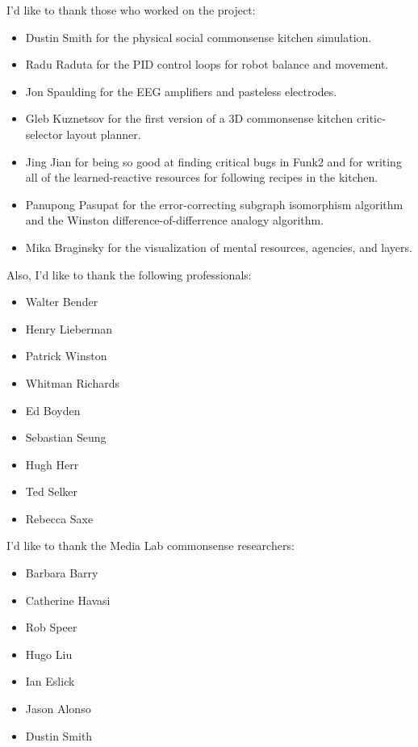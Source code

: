 \vspace{5mm}

I'd like to thank those who worked on the project:
\begin{itemize}
\item{Dustin Smith for the physical social commonsense kitchen simulation.}
\item{Radu Raduta for the PID control loops for robot balance and movement.}
\item{Jon Spaulding for the EEG amplifiers and pasteless electrodes.}
\item{Gleb Kuznetsov for the first version of a 3D commonsense kitchen critic-selector layout planner.}
\item{Jing Jian for being so good at finding critical bugs in Funk2 and for writing all of the learned-reactive resources for following recipes in the kitchen.}
\item{Panupong Pasupat for the error-correcting subgraph isomorphism algorithm and the Winston difference-of-differrence analogy algorithm.}
\item{Mika Braginsky for the visualization of mental resources, agencies, and layers.}
\end{itemize}

\vspace{5mm}

Also, I'd like to thank the following professionals:
\begin{itemize}
\item{Walter Bender}
\item{Henry Lieberman}
\item{Patrick Winston}
\item{Whitman Richards}
\item{Ed Boyden}
\item{Sebastian Seung}
\item{Hugh Herr}
\item{Ted Selker}
\item{Rebecca Saxe}
\end{itemize}

\vspace{5mm}

I'd like to thank the Media Lab commonsense researchers:
\begin{itemize}
\item{Barbara Barry}
\item{Catherine Havasi}
\item{Rob Speer}
\item{Hugo Liu}
\item{Ian Eslick}
\item{Jason Alonso}
\item{Dustin Smith}
\end{itemize}

